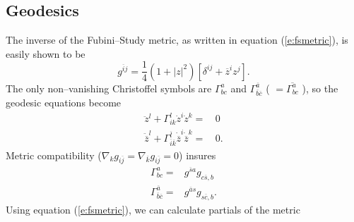 \subsection{Geodesics}

The inverse of the Fubini--Study metric, as written in
equation (\ref{e:fsmetric}), is easily shown to be
\begin{equation}
g^{\overline{i}j} = \frac{1}{4}\left( 
                    1+\left| z\right|^2 
                \right) \left[
                    \delta^{ij} + \overline{z}^iz^j
                \right].
\label{e:fsinvmetric}
\end{equation}
The only non--vanishing Christoffel symbols are $\Gamma^a_{bc}$ and
$\Gamma^{\overline{a}}_{\overline{b}\overline{c}}$ ( $=\overline{\Gamma^a_{bc}}$ ), 
so the geodesic equations become
\begin{equation}
\begin{split}
    \ddot{z}^l + \Gamma^l_{ik}\dot{z}^i\dot{z}^k =&\, 0\\
    \ddot{\overline{z}}^l + \Gamma^{\overline{l}}_{\overline{i}\overline{k}}
            \dot{\overline{z}}^i\dot{\overline{z}}^k =&\, 0.
\end{split}
\label{e:geodesics}
\end{equation}
Metric compatibility ($\nabla_kg_{i\overline{j}} = \nabla_{\overline{k}}
g_{i\overline{j}} = 0$) insures
\begin{equation}
\begin{split}
    \Gamma^a_{bc} =& g^{\overline{s}a} g_{c\overline{s},b}\\
    \Gamma^{\overline{a}}_{\overline{b}\overline{c}} =& g^{\overline{a}s} 
                            g_{s\overline{c},b}.
\end{split}
\label{e:xsymb}
\end{equation}
Using equation (\ref{e:fsmetric}), we can calculate partials of the metric 
